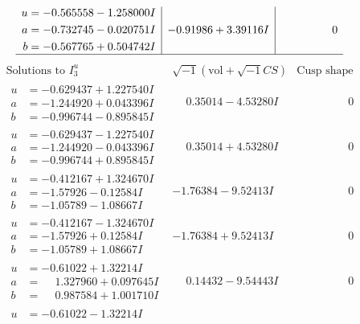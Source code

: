 \documentclass[1p]{elsarticle_modified}
\theoremstyle{definition}
\newcommand{\I}{\sqrt{-1}}
\begin{document}
$$\begin{array}{c|c|c}
\begin{aligned}
u &= -0.565558 - 1.258000 I \\
a &= -0.732745 - 0.020751 I \\
b &= -0.567765 + 0.504742 I\end{aligned}
 & -0.91986 + 3.39116 I & \phantom{-0.000000 } 0\\
 \hline 
 \end{array}$$\newpage$$\begin{array}{c|c|c}  
\text{Solutions to }I^u_{3}& \I (\text{vol} + \sqrt{-1}CS) & \text{Cusp shape}\\
 \hline 
\begin{aligned}
u &= -0.629437 + 1.227540 I \\
a &= -1.244920 + 0.043396 I \\
b &= -0.996744 - 0.895845 I\end{aligned}
 & \phantom{-}0.35014 - 4.53280 I & \phantom{-0.000000 } 0 \\ \hline\begin{aligned}
u &= -0.629437 - 1.227540 I \\
a &= -1.244920 - 0.043396 I \\
b &= -0.996744 + 0.895845 I\end{aligned}
 & \phantom{-}0.35014 + 4.53280 I & \phantom{-0.000000 } 0 \\ \hline\begin{aligned}
u &= -0.412167 + 1.324670 I \\
a &= -1.57926 - 0.12584 I \\
b &= -1.05789 - 1.08667 I\end{aligned}
 & -1.76384 - 9.52413 I & \phantom{-0.000000 } 0 \\ \hline\begin{aligned}
u &= -0.412167 - 1.324670 I \\
a &= -1.57926 + 0.12584 I \\
b &= -1.05789 + 1.08667 I\end{aligned}
 & -1.76384 + 9.52413 I & \phantom{-0.000000 } 0 \\ \hline\begin{aligned}
u &= -0.61022 + 1.32214 I \\
a &= \phantom{-}1.327960 + 0.097645 I \\
b &= \phantom{-}0.987584 + 1.001710 I\end{aligned}
 & \phantom{-}0.14432 - 9.54443 I & \phantom{-0.000000 } 0 \\ \hline\begin{aligned}
u &= -0.61022 - 1.32214 I \\

\end{aligned}
\end{array}$$
\end{document}
